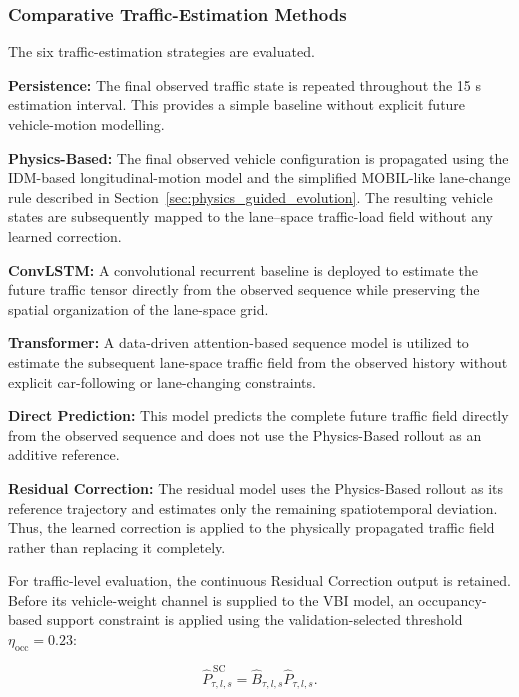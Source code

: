 \documentclass[journal]{IEEEtran}
\begin{document}
\subsubsection{Comparative Traffic-Estimation Methods}

The six
traffic-estimation strategies are evaluated.

\textbf{Persistence:}
The final observed traffic state is repeated throughout the 15 s estimation
interval. This provides a simple baseline without explicit future
vehicle-motion modelling.

\textbf{Physics-Based:}
The final observed vehicle configuration is propagated using the IDM-based
longitudinal-motion model and the simplified MOBIL-like lane-change rule
described in Section~\ref{sec:physics_guided_evolution}. The resulting vehicle states are subsequently mapped
to the lane--space traffic-load field without any learned correction.

\textbf{ConvLSTM:}
A convolutional recurrent baseline is deployed to estimate the future traffic
tensor directly from the observed sequence while preserving the spatial
organization of the lane-space grid.

\textbf{Transformer:}
A data-driven attention-based sequence model is utilized to estimate the
subsequent lane-space traffic field from the observed history without explicit
car-following or lane-changing constraints.

\textbf{Direct Prediction:}
This model predicts the complete future traffic field directly from the
observed sequence and does not use the Physics-Based rollout as an additive
reference.

\textbf{Residual Correction:}
The residual model uses the Physics-Based rollout as its reference trajectory
and estimates only the remaining spatiotemporal deviation. Thus, the learned
correction is applied to the physically propagated traffic field rather than
replacing it completely.

For traffic-level
evaluation, the continuous Residual Correction output is retained. Before its
vehicle-weight channel is supplied to the VBI model, an occupancy-based support
constraint is applied using the validation-selected threshold
{\color{blue}$\eta_{\mathrm{occ}}=0.23$}:

\begin{equation}
\widehat{P}^{\,\mathrm{SC}}_{\tau,l,s}
=
\widehat{B}_{\tau,l,s}\widehat{P}_{\tau,l,s}.
\label{eq:support_consistent_load}
\end{equation}
\end{document}
